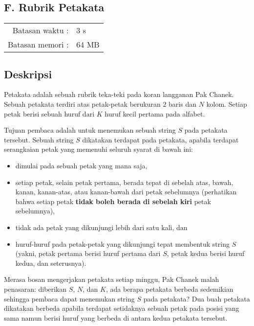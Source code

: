 \documentclass[../main_problemset.tex]{subfiles} %
\newcommand{\problemName}{F. Rubrik Petakata}
\newcommand{\problemTL}{3 s}
\newcommand{\problemML}{64 MB}
\begin{document}
\begin{center}
    \section*{\problemName}
    \addcontentsline{toc}{section}{\problemName} %
    
    \begin{tabular}{rl}
    Batasan waktu : & \problemTL \\
    Batasan memori : & \problemML
    \end{tabular}
\end{center}

\subsection*{Deskripsi}

Petakata adalah sebuah rubrik teka-teki pada koran langganan Pak Chanek. Sebuah petakata terdiri atas petak-petak berukuran $ 2 $ baris dan $ N $ kolom. Setiap petak berisi sebuah huruf dari $ K $ huruf kecil pertama pada alfabet.

Tujuan pembaca adalah untuk menemukan sebuah string $ S $ pada petakata tersebut. Sebuah string $ S $ dikatakan terdapat pada petakata, apabila terdapat serangkaian petak yang memenuhi seluruh syarat di bawah ini:

\begin{itemize}
	\item dimulai pada sebuah petak yang mana saja,
	\item setiap petak, selain petak pertama, berada tepat di sebelah atas, bawah, kanan, kanan-atas, atau kanan-bawah dari petak sebelumnya (perhatikan bahwa setiap petak \textbf{tidak boleh berada di sebelah kiri} petak sebelumnya),
	\item tidak ada petak yang dikunjungi lebih dari satu kali, dan
	\item huruf-huruf pada petak-petak yang dikunjungi tepat membentuk string $ S $ (yakni, petak pertama berisi huruf pertama dari $ S $, petak kedua berisi huruf kedua, dan seterusnya).
\end{itemize}

Merasa bosan mengerjakan petakata setiap minggu, Pak Chanek malah penasaran: diberikan $ S $, $ N $, dan $ K $, ada berapa petakata berbeda sedemikian sehingga pembaca dapat menemukan string $ S $ pada petakata? Dua buah petakata dikatakan berbeda apabila terdapat setidaknya sebuah petak pada posisi yang sama namun berisi huruf yang berbeda di antara kedua petakata tersebut.
\end{document}
